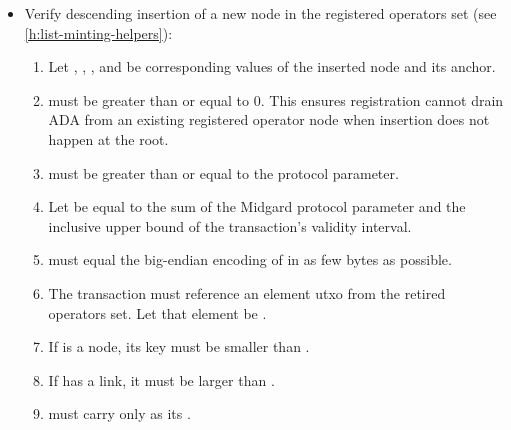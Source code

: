 \documentclass[../midgard.tex]{subfiles}
\begin{document}
\begin{description}
\begin{itemize}
\begin{enumerate}[resume]
                      Let that element be .
                    \item If  is a node, its key must be smaller than .
                    \item If  has a link, it must be larger than .
                \end{enumerate}
            \item Verify descending insertion of a new node in the registered operators set (see \cref{h:list-minting-helpers}):
                \begin{enumerate}[resume]
                    \item Let , , , and  be corresponding values of the inserted node and its anchor.
                    \item {} must be greater than or equal to 0.
                      This ensures registration cannot drain ADA from an existing registered operator node when insertion does not happen at the root.
                    \item {} must be greater than or equal to the  protocol parameter.
                    \item Let  be equal to the sum of the Midgard  protocol parameter and the inclusive upper bound of the transaction's validity interval.
                    \item {} must equal the big-endian encoding of  in as few bytes as possible.
                    \item The transaction must reference an element utxo from the retired operators set.
                      Let that element be .
                    \item If  is a node, its key must be smaller than .
                    \item If  has a link, it must be larger than .
                    \item {} must carry only  as its .
                \end{enumerate}

\end{itemize}
\end{description}
\end{document}
